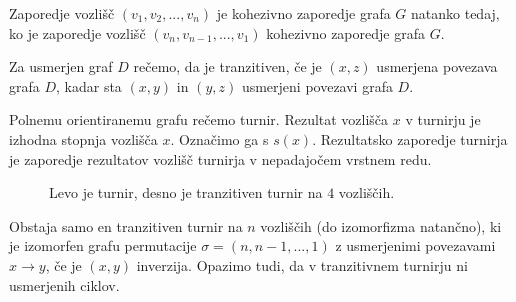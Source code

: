 \documentclass[a4paper, 12pt]{book}
\begin{document}
Zaporedje vozlišč $(v_1, v_2, ..., v_n)$ je kohezivno zaporedje grafa $G$ natanko tedaj, ko je zaporedje vozlišč $(v_n, v_{n-1}, ..., v_1)$ kohezivno zaporedje grafa $G$.

Za usmerjen graf $D$ rečemo, da je tranzitiven, če je $(x, z)$ usmerjena povezava grafa $D$, kadar sta $(x, y)$ in $(y, z)$ usmerjeni povezavi grafa $D$. 

Polnemu orientiranemu grafu rečemo turnir. Rezultat vozlišča $x$ v turnirju je izhodna stopnja vozlišča $x$. Označimo ga s $s(x)$. Rezultatsko zaporedje turnirja je zaporedje rezultatov vozlišč turnirja v nepadajočem vrstnem redu.

\begin{figure}[h]
    \begin{center}        
    \end{center}
    \caption{Levo je turnir, desno je tranzitiven turnir na $4$ vozliščih.}
    \label{graf_turnirja_in_tranzitivnega_turnirja}
\end{figure}

Obstaja samo en tranzitiven turnir na $n$ vozliščih (do izomorfizma natančno), ki je izomorfen grafu permutacije $\sigma = (n, n-1, ..., 1)$ z usmerjenimi povezavami $x \rightarrow y$, če je $(x, y)$ inverzija. Opazimo tudi, da v tranzitivnem turnirju ni usmerjenih ciklov. 
\end{document}

